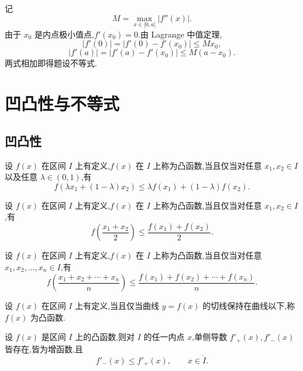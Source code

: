 \begin{solution}
    记
    \[
        M=\max\limits_{x\in\lbrack0,a\rbrack}|f''(x)|.
    \]
    由于 $x_0$ 是内点极小值点,$f'(x_0)=0$.由 Lagrange 中值定理,
    \[
        |f'(0)|=|f'(0)-f'(x_0)|\leq Mx_0,
    \]
    \[
        |f'(a)|=|f'(a)-f'(x_0)|\leq M(a-x_0).
    \]
    两式相加即得题设不等式.
\end{solution}


\newpage

\section{凹凸性与不等式}


\subsection{凹凸性}

\begin{definition}
    设 $f(x)$ 在区间 $I$ 上有定义,$f(x)$ 在 $I$ 上称为凸函数,当且仅当对任意 $x_1,x_2\in I$ 以及任意 $\lambda\in(0,1)$,有
    \[
        f(\lambda x_1+(1-\lambda)x_2)
        \leq\lambda f(x_1)+(1-\lambda)f(x_2).
    \]
\end{definition}

\begin{definition}
    设 $f(x)$ 在区间 $I$ 上有定义,$f(x)$ 在 $I$ 上称为凸函数,当且仅当对任意 $x_1,x_2\in I$,有
    \[
        f\left(\dfrac{x_1+x_2}{2}\right)
        \leq\dfrac{f(x_1)+f(x_2)}{2}.
    \]
\end{definition}

\begin{definition}
    设 $f(x)$ 在区间 $I$ 上有定义,$f(x)$ 在 $I$ 上称为凸函数,当且仅当对任意 $x_1,x_2,\ldots,x_n\in I$,有
    \[
        f\left(\dfrac{x_1+x_2+\cdots+x_n}{n}\right)
        \leq\dfrac{f(x_1)+f(x_2)+\cdots+f(x_n)}{n}.
    \]
\end{definition}

\begin{definition}
    设 $f(x)$ 在区间 $I$ 上有定义,当且仅当曲线 $y=f(x)$ 的切线保持在曲线以下,称 $f(x)$ 为凸函数.
\end{definition}

\begin{lemma}[\markstar]
    设 $f(x)$ 是区间 $I$ 上的凸函数,则对 $I$ 的任一内点 $x$,单侧导数 $f'_+(x),f'_-(x)$ 皆存在,皆为增函数,且
    \[
        f'_-(x)\leq f'_+(x),
        \qquad x\in\mathring I.
    \]
\end{lemma}

